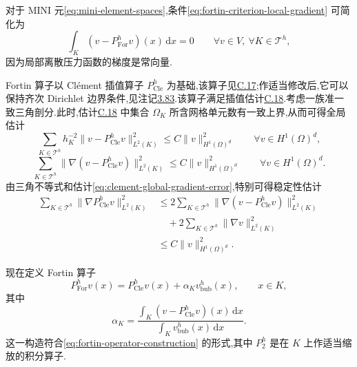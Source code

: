 \begin{note}\label{note:mini-local-condition}
对于 MINI 元\cref{eq:mini-element-spaces},条件\cref{eq:fortin-criterion-local-gradient} 可简化为
\begin{equation}\label{eq:mini-fortin-local-mean}
  \int_K (v-P_{\mathrm{For}}^h v)(x)\,\mathrm{d}x=0
  \qquad\forall v\in V,\ \forall K\in\mathcal{T}^h,
\end{equation}
因为局部离散压力函数的梯度是常向量.
\end{note}

\begin{note}\label{note:mini-fortin-construction}
Fortin 算子以 Clément 插值算子 $P_{\mathrm{Cle}}^h$ 为基础,该算子见\hyperref[eq:appendix-c-17]{C.17};作适当修改后,它可以保持齐次 Dirichlet 边界条件,见注记\hyperref[note:fortin-detailed-construction]{3.83}.该算子满足插值估计\hyperref[eq:appendix-c-18]{C.18}.考虑一族准一致三角剖分.此时,估计\hyperref[eq:appendix-c-18]{C.18} 中集合 $\Omega_K$ 所含网格单元数有一致上界,从而可得全局估计
\begin{equation}\label{eq:clement-global-l2-error}
  \sum_{K\in\mathcal{T}^h}h_K^{-2}
       \|v-P_{\mathrm{Cle}}^h v\|_{L^2(K)}^2
  \le C\|v\|_{H^1(\Omega)^d}^2
  \qquad\forall v\in H^1(\Omega)^d,
\end{equation}
\begin{equation}\label{eq:clement-global-gradient-error}
  \sum_{K\in\mathcal{T}^h}
       \|\nabla(v-P_{\mathrm{Cle}}^h v)\|_{L^2(K)}^2
  \le C\|v\|_{H^1(\Omega)^d}^2
  \qquad\forall v\in H^1(\Omega)^d.
\end{equation}
由三角不等式和估计\cref{eq:clement-global-gradient-error},特别可得稳定性估计
\begin{equation}\label{eq:clement-global-stability}
\begin{aligned}
  \sum_{K\in\mathcal{T}^h}
       \|\nabla P_{\mathrm{Cle}}^h v\|_{L^2(K)}^2
  &\le 2\sum_{K\in\mathcal{T}^h}
       \|\nabla(v-P_{\mathrm{Cle}}^h v)\|_{L^2(K)}^2\\
  &\quad+2\sum_{K\in\mathcal{T}^h}\|\nabla v\|_{L^2(K)}^2\\
  &\le C\|v\|_{H^1(\Omega)^d}^2.
\end{aligned}
\end{equation}

现在定义 Fortin 算子
\begin{equation}\label{eq:mini-fortin-operator}
  P_{\mathrm{For}}^h v(x)
  =P_{\mathrm{Cle}}^h v(x)+\alpha_Kv_{\mathrm{bub}}^h(x),
  \qquad x\in K,
\end{equation}
其中
\begin{equation}\label{eq:mini-fortin-bubble-coefficient}
  \alpha_K
  =\frac{\displaystyle\int_K(v-P_{\mathrm{Cle}}^h v)(x)\,\mathrm{d}x}
         {\displaystyle\int_Kv_{\mathrm{bub}}^h(x)\,\mathrm{d}x}.
\end{equation}
这一构造符合\cref{eq:fortin-operator-construction} 的形式,其中 $P_2^h$ 是在 $K$ 上作适当缩放的积分算子.
\end{note}

